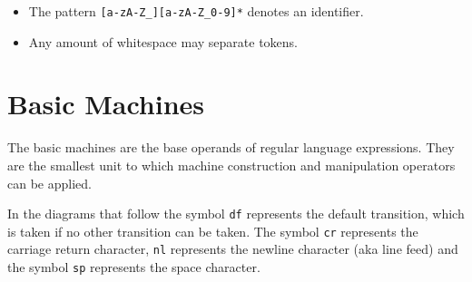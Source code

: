 \documentclass[letterpaper,11pt,oneside]{book}
\begin{document}
\begin{itemize}
\item The pattern \verb|[a-zA-Z_][a-zA-Z_0-9]*| denotes an identifier.

%

\item Any amount of whitespace may separate tokens.

\end{itemize}




\section{Basic Machines}
\label{basic}

The basic machines are the base operands of regular language expressions. They
are the smallest unit to which machine construction and manipulation operators
can be applied.

In the diagrams that follow the symbol \verb|df| represents
the default transition, which is taken if no other transition can be taken. The
symbol \verb|cr| represents the carriage return character, \verb|nl| represents the newline character (aka line feed) and the symbol
\verb|sp| represents the space character.
\end{document}
